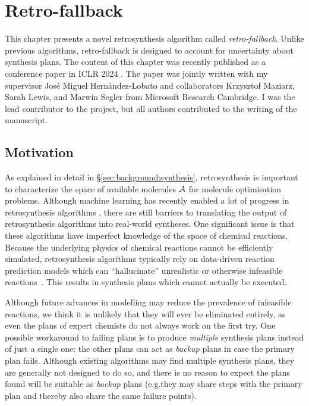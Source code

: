 \chapter{Retro-fallback}
\label{chapter:rfb}

\ifpdf
    \graphicspath{{chapter0x-rfb/}}
\else
    \graphicspath{}
\fi

This chapter presents a novel retrosynthesis algorithm called \emph{retro-fallback}.
Unlike previous algorithms,
retro-fallback is designed to account for uncertainty about synthesis plans.
The content of this chapter was recently published as a
conference paper in ICLR 2024 \citep{tripp2023retrofallback}.
The paper was jointly written with
my supervisor José Miguel Hernández-Lobato
and collaborators
Krzysztof Maziarz, Sarah Lewis, and Marwin Segler
from Microsoft Research Cambridge.
I was the lead contributor to the project,
but all authors contributed to the writing of the manuscript.

\section{Motivation}
\label{sec:rfb:motivation}

As explained in detail in \S\ref{sec:background:synthesis},
retrosynthesis is important to characterize the space of available molecules
$\mathcal{A}$ for molecule optimisation problems.
Although machine learning has recently enabled a lot of progress in retrosynthesis algorithms
\citep{strieth2020machine,tu2023predictive,stanley2023fake},
there are still barriers to translating the output of retrosynthesis algorithms into real-world syntheses.
One significant issue is that these algorithms have imperfect knowledge of the space of chemical reactions.
Because the underlying physics of chemical reactions cannot be efficiently simulated,
retrosynthesis algorithms typically rely on data-driven reaction prediction models which can ``hallucinate'' unrealistic
or otherwise infeasible reactions~\citep{zhong2023retrosynthesis}.
This results in synthesis plans which cannot actually be executed.

Although future advances in modelling may reduce the prevalence of infeasible reactions,
we think it is unlikely that they will ever be eliminated entirely, as even the plans of expert chemists do not always work on the first try.
One possible workaround to failing plans is to produce \emph{multiple} synthesis plans instead of just a single one:
the other plans can act as \emph{backup} plans in case the primary plan fails.
Although existing algorithms may find multiple synthesis plans, they are generally not designed to do so,
and there is no reason to expect the plans found will be suitable as \emph{backup} plans (e.g.\@ they may share steps with the primary plan and thereby also share the same failure points).

